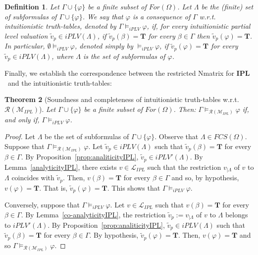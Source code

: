 \documentclass[12pt]{article}
\newtheorem{theorem}{Theorem}[section]
\newtheorem{definition}[theorem]{Definition}
\newcommand{\bT}{\mathbf{T}}
\newcommand{\ipl}{\ensuremath{\mathbf{IPL}}}
\begin{document}
\begin{definition} \label{def_conseq_truth_tablesIPL}
Let $\Gamma  \cup \{\varphi\}$ be  a finite subset of  $For(\Omega)$. Let $\Lambda$ be the (finite) set of subformulas of $\Gamma \cup \{\varphi\}$.  We say that $\varphi$ is a consequence of $\Gamma$ w.r.t.  intuitionistic truth-tables, denoted by $\Gamma \models_{iPLV} \varphi$, if, for every intuitionistic partial level valuation $\tilde v_p \in iPLV(\Lambda)$, if $\tilde v_p(\beta)=\bT$ for every $\beta \in \Gamma$ then $\tilde v_p(\varphi)=\bT$. In particular, $\emptyset \models_{iPLV} \varphi$, denoted simply by $ \models_{iPLV} \varphi$, if $\tilde v_p(\varphi)=\bT$ for every $\tilde v_p \in iPLV(\Lambda)$, where $\Lambda$ is the set of subformulas of $\varphi$.
\end{definition}

Finally, we establish the correspondence between the restricted Nmatrix  for \ipl\ and the intuitionistic truth-tables:

\begin{theorem} [Soundness and completeness of intuitionistic truth-tables w.r.t.  $\mathcal{R}(\mathcal{M}_{IPL})$] \label{Theor:sound_compl_IPL0} 
Let $\Gamma  \cup \{\varphi\}$ be  a finite subset of  $For(\Omega)$. Then: $\Gamma \models_{\mathcal{R}(\mathcal{M}_{IPL})} \varphi$ if, and only if, $\Gamma \models_{iPLV} \varphi$.
\end{theorem}
\begin{proof} Let $\Lambda$ be the set of subformulas of $\Gamma  \cup \{\varphi\}$. Observe that $\Lambda \in FCS(\Omega)$.
Suppose that $\Gamma\models_{\mathcal{R}(\mathcal{M}_{IPL})} \varphi$. 
Let $\tilde v_p \in iPLV(\Lambda)$ such that $\tilde v_p(\beta)=\bT$ for every $\beta \in \Gamma$. By Proposition~\ref{prop:analiticityIPL}, $\tilde v_p \in iPLV'(\Lambda)$. By Lemma~\ref{analyticityIPL},  there exists $v \in \mathcal{L}_{IPL}$ such that the restriction $v_{|\Lambda}$ of $v$ to $\Lambda$ coincides with $\tilde v_p$. Then, $v(\beta)=\bT$ for every $\beta \in \Gamma$ and so, by hypothesis, $v(\varphi)=\bT$. That is, $\tilde v_p(\varphi)=\bT$. This shows that $\Gamma \models_{iPLV} \varphi$.

Conversely, suppose that  $\Gamma \models_{iPLV} \varphi$. Let $v \in \mathcal{L}_{IPL}$ such that $v(\beta)=\bT$ for every $\beta \in \Gamma$. By Lemma~\ref{co-analyticityIPL}, the restriction $\tilde v_p:=v_{|\Lambda}$ of $v$ to $\Lambda$ belongs to $iPLV'(\Lambda)$. By Proposition~\ref{prop:analiticityIPL},  $\tilde v_p \in iPLV(\Lambda)$ such that  $\tilde v_p(\beta)=\bT$ for every $\beta \in \Gamma$. By hypothesis, $\tilde v_p(\varphi)=\bT$. Then, $v(\varphi)=\bT$ and so $\Gamma\models_{\mathcal{R}(\mathcal{M}_{IPL})} \varphi$.
\end{proof}
\end{document}
